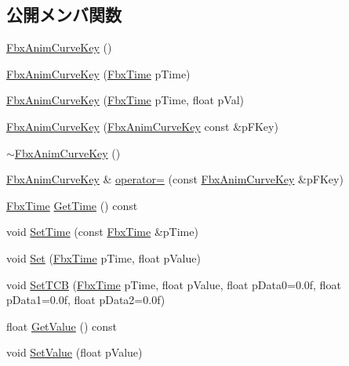 \subsection*{公開メンバ関数}
\begin{DoxyCompactItemize}
\item 
\hyperlink{class_fbx_anim_curve_key_acc70533fb017bc71b617aaa37ee2e19f}{Fbx\+Anim\+Curve\+Key} ()
\item 
\hyperlink{class_fbx_anim_curve_key_a5fc23a90c53bc0655161813ee4f6ae00}{Fbx\+Anim\+Curve\+Key} (\hyperlink{class_fbx_time}{Fbx\+Time} p\+Time)
\item 
\hyperlink{class_fbx_anim_curve_key_a3e967d8e8d05da27ba82dcebfe2533fc}{Fbx\+Anim\+Curve\+Key} (\hyperlink{class_fbx_time}{Fbx\+Time} p\+Time, float p\+Val)
\item 
\hyperlink{class_fbx_anim_curve_key_ab5d7663cc4993863b80b13e0b5dca835}{Fbx\+Anim\+Curve\+Key} (\hyperlink{class_fbx_anim_curve_key}{Fbx\+Anim\+Curve\+Key} const \&p\+F\+Key)
\item 
\hyperlink{class_fbx_anim_curve_key_af0269dd6206c85565ed29b01b39df8ff}{$\sim$\+Fbx\+Anim\+Curve\+Key} ()
\item 
\hyperlink{class_fbx_anim_curve_key}{Fbx\+Anim\+Curve\+Key} \& \hyperlink{class_fbx_anim_curve_key_a13c344143cd73f6809edbbb91df08c0e}{operator=} (const \hyperlink{class_fbx_anim_curve_key}{Fbx\+Anim\+Curve\+Key} \&p\+F\+Key)
\item 
\hyperlink{class_fbx_time}{Fbx\+Time} \hyperlink{class_fbx_anim_curve_key_aae0882b53b31502cb30ea35de028837f}{Get\+Time} () const
\item 
void \hyperlink{class_fbx_anim_curve_key_a6ebc96b8346a345534c0eb2e1b6d9291}{Set\+Time} (const \hyperlink{class_fbx_time}{Fbx\+Time} \&p\+Time)
\item 
void \hyperlink{class_fbx_anim_curve_key_afdab5f0d38bedc7c4715aaa6a51d4370}{Set} (\hyperlink{class_fbx_time}{Fbx\+Time} p\+Time, float p\+Value)
\item 
void \hyperlink{class_fbx_anim_curve_key_ace0cb6af3027da5a2ea28ac7e5f528be}{Set\+T\+CB} (\hyperlink{class_fbx_time}{Fbx\+Time} p\+Time, float p\+Value, float p\+Data0=0.\+0f, float p\+Data1=0.\+0f, float p\+Data2=0.\+0f)
\item 
float \hyperlink{class_fbx_anim_curve_key_a7d66374255e912386ab894a5e2945ff5}{Get\+Value} () const
\item 
void \hyperlink{class_fbx_anim_curve_key_a4d7ea46fc9d4a6691c5e6d97569c7ae1}{Set\+Value} (float p\+Value)
\item 

\end{DoxyCompactItemize}
